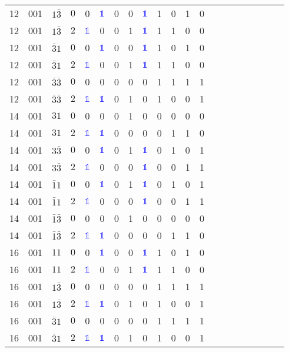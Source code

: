 \begin{longtable*}{c| cccccccccccccccccccc }
12& 001& $1\bar{3}$& $0$& 0& \textcolor{blue}{$\mathds{1}$}& 0& 0& \textcolor{blue}{$\mathds{1}$}& 1& 0& 1& 0\\
12& 001& $1\bar{3}$& $2$& \textcolor{blue}{$\mathds{1}$}& 0& 0& 1& \textcolor{blue}{$\mathds{1}$}& 1& 1& 0& 0\\
12& 001& $\bar{3}1$& $0$& 0& \textcolor{blue}{$\mathds{1}$}& 0& 0& \textcolor{blue}{$\mathds{1}$}& 1& 0& 1& 0\\
12& 001& $\bar{3}1$& $2$& \textcolor{blue}{$\mathds{1}$}& 0& 0& 1& \textcolor{blue}{$\mathds{1}$}& 1& 1& 0& 0\\
12& 001& $\bar{3}\bar{3}$& $0$& 0& 0& 0& 0& 0& 1& 1& 1& 1\\
12& 001& $\bar{3}\bar{3}$& $2$& \textcolor{blue}{$\mathds{1}$}& \textcolor{blue}{$\mathds{1}$}& 0& 1& 0& 1& 0& 0& 1\\
14& 001& $31$& $0$& 0& 0& 0& 1& 0& 0& 0& 0& 0\\
14& 001& $31$& $2$& \textcolor{blue}{$\mathds{1}$}& \textcolor{blue}{$\mathds{1}$}& 0& 0& 0& 0& 1& 1& 0\\
14& 001& $3\bar{3}$& $0$& 0& \textcolor{blue}{$\mathds{1}$}& 0& 1& \textcolor{blue}{$\mathds{1}$}& 0& 1& 0& 1\\
14& 001& $3\bar{3}$& $2$& \textcolor{blue}{$\mathds{1}$}& 0& 0& 0& \textcolor{blue}{$\mathds{1}$}& 0& 0& 1& 1\\
14& 001& $\bar{1}1$& $0$& 0& \textcolor{blue}{$\mathds{1}$}& 0& 1& \textcolor{blue}{$\mathds{1}$}& 0& 1& 0& 1\\
14& 001& $\bar{1}1$& $2$& \textcolor{blue}{$\mathds{1}$}& 0& 0& 0& \textcolor{blue}{$\mathds{1}$}& 0& 0& 1& 1\\
14& 001& $\bar{1}\bar{3}$& $0$& 0& 0& 0& 1& 0& 0& 0& 0& 0\\
14& 001& $\bar{1}\bar{3}$& $2$& \textcolor{blue}{$\mathds{1}$}& \textcolor{blue}{$\mathds{1}$}& 0& 0& 0& 0& 1& 1& 0\\
16& 001& $11$& $0$& 0& \textcolor{blue}{$\mathds{1}$}& 0& 0& \textcolor{blue}{$\mathds{1}$}& 1& 0& 1& 0\\
16& 001& $11$& $2$& \textcolor{blue}{$\mathds{1}$}& 0& 0& 1& \textcolor{blue}{$\mathds{1}$}& 1& 1& 0& 0\\
16& 001& $1\bar{3}$& $0$& 0& 0& 0& 0& 0& 1& 1& 1& 1\\
16& 001& $1\bar{3}$& $2$& \textcolor{blue}{$\mathds{1}$}& \textcolor{blue}{$\mathds{1}$}& 0& 1& 0& 1& 0& 0& 1\\
16& 001& $\bar{3}1$& $0$& 0& 0& 0& 0& 0& 1& 1& 1& 1\\
16& 001& $\bar{3}1$& $2$& \textcolor{blue}{$\mathds{1}$}& \textcolor{blue}{$\mathds{1}$}& 0& 1& 0& 1& 0& 0& 1\\

\end{longtable*}
